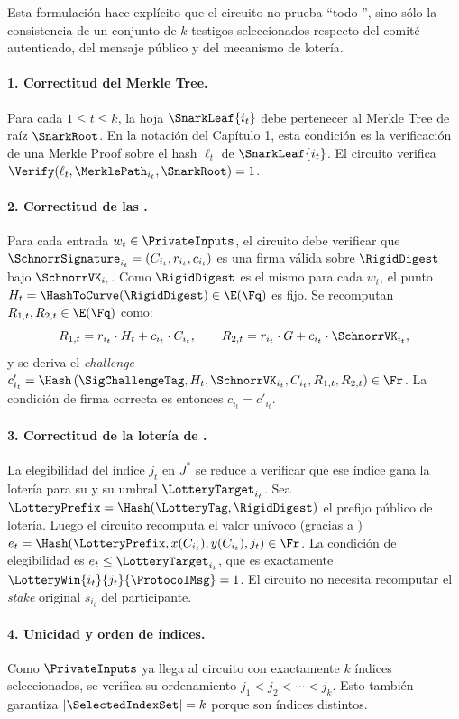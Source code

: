 Esta formulación hace explícito que el circuito no prueba ``todo \Mithril'', sino sólo la consistencia de un conjunto de \(k\) testigos seleccionados respecto del comité autenticado, del mensaje público y del mecanismo de lotería.

\paragraph{1. Correctitud del Merkle Tree.}
Para cada $1 \leq t \leq k$, la hoja $\SnarkLeaf{i_t}$ debe pertenecer al Merkle Tree de raíz $\SnarkRoot$. En la notación del Capítulo 1, esta condición es la verificación de una Merkle Proof sobre el hash $\ell_t$ de $\SnarkLeaf{i_t}$. El circuito verifica $\Verify(\ell_t, \MerklePath_{i_t}, \SnarkRoot) = 1$.

\paragraph{2. Correctitud de las \UniqueSchnorrSignature.}
Para cada entrada $w_t \in \PrivateInputs$, el circuito debe verificar que $\SchnorrSignature_{i_t} = (C_{i_t},r_{i_t},c_{i_t})$ es una firma válida sobre $\RigidDigest$ bajo $\SchnorrVK_{i_t}$. Como $\RigidDigest$ es el mismo para cada $w_t$, el punto $H_t = \HashToCurve(\RigidDigest) \in \E(\Fq)$ es fijo. Se recomputan $R_{1,t}, R_{2, t} \in \E(\Fq)$ como:
$$R_{1, t} = r_{i_t} \cdot H_t + c_{i_t} \cdot C_{i_t}, \qquad R_{2,t} = r_{i_t} \cdot G + c_{i_t} \cdot \SchnorrVK_{i_t},$$
y se deriva el \textit{challenge} $c'_{i_t} = \Hash \left(\SigChallengeTag, H_t, \SchnorrVK_{i_t}, C_{i_t}, R_{1,t}, R_{2,t} \right) \in \Fr$. La condición de firma correcta es entonces $c_{i_t} = c'_{i_t}$.

\paragraph{3. Correctitud de la lotería de \Mithril.}
La elegibilidad del índice $j_t$ en $J^*$ se reduce a verificar que ese índice gana la lotería para su \UniqueSchnorrSignature y su umbral $\LotteryTarget_{i_t}$. Sea $\LotteryPrefix = \Hash(\LotteryTag, \RigidDigest)$ el prefijo público de lotería. Luego el circuito recomputa el valor unívoco (gracias a \UniqueSchnorrSignature) $e_t = \Hash(\LotteryPrefix, x(C_{i_t}), y(C_{i_t}), j_t) \in \Fr$. La condición de elegibilidad es $e_t \leq \LotteryTarget_{i_t}$, que es exactamente  $\LotteryWin{i_t}{j_t}{\ProtocolMsg} = 1$. El circuito no necesita recomputar el \textit{stake} original $s_{i_t}$ del participante.

\paragraph{4. Unicidad y orden de índices.}
Como $\PrivateInputs$ ya llega al circuito con exactamente $k$ índices seleccionados, se verifica su ordenamiento $j_1 < j_2 < \cdots < j_k$. Esto también garantiza $|\SelectedIndexSet| = k$ porque son índices distintos.
